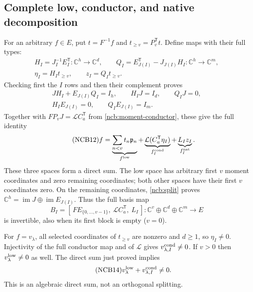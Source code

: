\documentclass[11pt,a4paper]{article}
\begin{document}
\subsection{Complete low, conductor, and native decomposition}
For an arbitrary $f\in E$, put $t=F^{-1}f$ and
$t_{\geq v}=P_v^{\mathsf T}t$. Define maps with their full types:
\begin{equation}\tag{NCB10}\label{ncb:HQ}
\begin{gathered}
H_I=J_I^{-1}E_I^{\mathsf T}:\mathbb C^h\to\mathbb C^d,\qquad
Q_I=E_{J(I)}^{\mathsf T}-J_{J(I)}H_I:
       \mathbb C^h\to\mathbb C^m,\\
\eta_I=H_It_{\geq v},\qquad z_I=Q_It_{\geq v}.
\end{gathered}
\end{equation}
Checking first the $I$ rows and then their complement proves
\begin{equation}\tag{NCB11}\label{ncb:split}
\begin{gathered}
JH_I+E_{J(I)}Q_I=I_h,\qquad H_IJ=I_d,\qquad Q_IJ=0,\\
H_IE_{J(I)}=0,\qquad Q_IE_{J(I)}=I_m.
\end{gathered}
\end{equation}
Together with $FP_vJ=\mathcal LC_a^{\mathsf T}$ from
\eqref{ncb:moment-conductor}, these give the full identity
\begin{equation}\tag{NCB12}\label{ncb:decomposition}
f=\underbrace{\sum_{n<v}t_n\mathfrak p_n}_{f^{\rm low}}
 +\underbrace{\mathcal L(C_a^{\mathsf T}\eta_I)}_{f_I^{\rm cond}}
 +\underbrace{L_Iz_I}_{f_I^{\rm nat}} .
\end{equation}
These three spaces form a direct sum. The low space has arbitrary
first $v$ moment coordinates and zero remaining coordinates; both
other spaces have their first $v$ coordinates zero. On the remaining
coordinates, \eqref{ncb:split} proves
$\mathbb C^h=\operatorname{im}J\oplus\operatorname{im}E_{J(I)}$.
Thus the full basis map
\begin{equation}\tag{NCB13}\label{ncb:full-chart}
B_I=[\,FE_{\{0,\ldots,v-1\}},\ \mathcal LC_a^{\mathsf T},\ L_I\,]:
\mathbb C^v\oplus\mathbb C^d\oplus\mathbb C^m\longrightarrow E
\end{equation}
is invertible, also when its first block is empty ($v=0$).

For $f=v_\lambda$, all selected coordinates of $t_{\geq v}$ are
nonzero and $d\geq1$, so $\eta_I\ne0$. Injectivity of the full
conductor map and of $\mathcal L$ gives
$v_{\lambda,I}^{\rm cond}\ne0$. If $v>0$ then
$v_\lambda^{\rm low}\ne0$ as well. The direct sum just proved implies
\begin{equation}\tag{NCB14}\label{ncb:nonzero}
v_\lambda^{\rm low}+v_{\lambda,I}^{\rm cond}\ne0 .
\end{equation}
This is an algebraic direct sum, not an orthogonal splitting.
\end{document}
